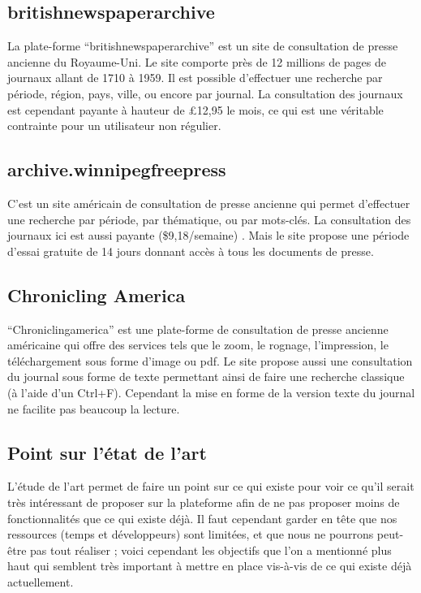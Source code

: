         \subsection{britishnewspaperarchive}
        \label{subsec:britishnewspaper}
        La plate-forme “britishnewspaperarchive” est un site de consultation de presse ancienne du Royaume-Uni.
        Le site comporte près de 12 millions de pages de journaux allant de 1710 à 1959. Il est possible
        d’effectuer une recherche par période, région, pays, ville, ou encore par journal. La consultation
        des journaux est cependant payante à hauteur de £12,95 le mois, ce qui est une véritable contrainte
        pour un utilisateur non régulier.

        \subsection{archive.winnipegfreepress}
        \label{subsec:winnipeg}
        C’est un site américain de consultation de presse ancienne qui permet d’effectuer une recherche par période,
        par thématique, ou par mots-clés. La consultation des journaux ici est aussi payante
        (\$9,18/semaine) . Mais le site propose une période d’essai gratuite de 14 jours donnant accès à tous les documents de presse.

        \subsection{Chronicling America}
        \label{subsec:chrinamerica}
        “Chroniclingamerica” est une plate-forme de consultation de presse ancienne américaine qui offre des services
        tels que le zoom, le rognage, l’impression, le téléchargement sous forme d’image ou pdf. Le site propose
        aussi une consultation du journal sous forme de texte permettant ainsi de faire une recherche classique
        (à l’aide d’un Ctrl+F). Cependant la mise en forme de la version texte du journal ne facilite pas beaucoup la lecture.


    \subsection{Point sur l’état de l’art}
    \label{sec:point}
    L’étude de l’art permet de faire un point sur ce qui existe pour voir ce qu’il serait très intéressant de proposer
    sur la plateforme afin de ne pas proposer moins de fonctionnalités que ce qui existe déjà. Il faut cependant garder
    en tête que nos ressources (temps et développeurs) sont limitées, et que nous ne pourrons peut-être pas tout réaliser ;
    voici cependant les objectifs que l’on a mentionné plus haut qui semblent très important à mettre en place vis-à-vis
    de ce qui existe déjà actuellement.

